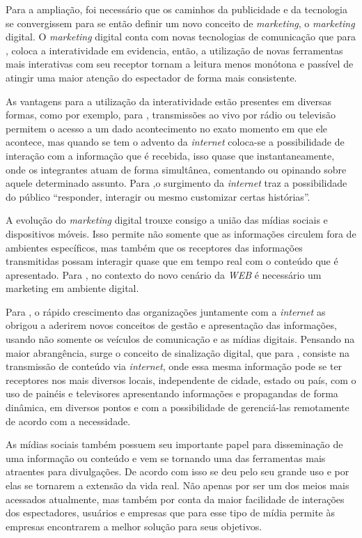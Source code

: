 Para a ampliação, foi necessário que os caminhos da publicidade e da tecnologia se convergissem para se então definir um novo conceito de \textit{marketing}, o \textit{marketing} digital. O \textit{marketing} digital conta com novas tecnologias de comunicação que para \cite[p.2]{escobar2007}, coloca a interatividade em evidencia, então, a utilização de novas ferramentas mais interativas com seu receptor tornam a leitura menos monótona e passível de atingir uma maior atenção do espectador de forma mais consistente.  

As vantagens para a utilização da interatividade estão presentes em diversas formas, como por exemplo, para \cite[p.4]{escobar2007}, transmissões ao vivo por rádio ou televisão permitem o acesso a um dado acontecimento no exato momento em que ele acontece, mas quando se tem o advento da \textit{internet} coloca-se a possibilidade de interação com a informação que é recebida, isso quase que instantaneamente, onde os integrantes atuam de forma simultânea, comentando ou opinando sobre aquele determinado assunto. Para \cite{deuze2002},o surgimento da \textit{internet} traz a possibilidade do público ``responder, interagir ou mesmo customizar certas histórias''. 

A evolução do \textit{marketing} digital trouxe consigo a união das mídias sociais e dispositivos móveis. Isso permite não somente que as informações circulem fora de ambientes específicos, mas também que os receptores das informações transmitidas possam interagir quase que em tempo real com o conteúdo que é apresentado. Para \cite{santos2014}, no contexto do novo cenário da \textit{WEB} é necessário um marketing em ambiente digital.

Para \cite[p.7]{machado2010}, o rápido crescimento das organizações juntamente com a \textit{internet} as obrigou a aderirem novos conceitos de gestão e apresentação das informações, usando não somente os veículos de comunicação e as mídias digitais. Pensando na maior abrangência, surge o conceito de sinalização digital, que para \cite[p.37]{machado2010}, consiste na transmissão de conteúdo via \textit{internet}, onde essa mesma informação pode se ter receptores nos mais diversos locais, independente de cidade, estado ou país, com o uso de painéis e televisores apresentando informações e propagandas de forma dinâmica, em diversos pontos e com a possibilidade de gerenciá-las remotamente de acordo com a necessidade. 

As mídias sociais também possuem seu importante papel para disseminação de uma informação ou conteúdo e vem se tornando uma das ferramentas mais atraentes para divulgações. De acordo com \cite{rosa2010} isso se deu pelo seu grande uso e por elas se tornarem a extensão da vida real. Não apenas por ser um dos meios mais acessados atualmente, mas também por conta da maior facilidade de interações dos espectadores, usuários e empresas que para \cite{rosa2010} esse tipo de mídia permite 
às empresas encontrarem a melhor solução para seus objetivos. 

